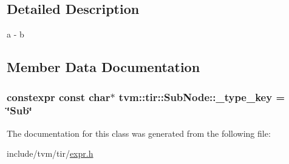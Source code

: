 \subsection{Detailed Description}
a -\/ b 

\subsection{Member Data Documentation}
\subsubsection[{\texorpdfstring{\+\_\+type\+\_\+key}{_type_key}}]{\setlength{\rightskip}{0pt plus 5cm}constexpr const char$\ast$ tvm\+::tir\+::\+Sub\+Node\+::\+\_\+type\+\_\+key = \char`\"{}Sub\char`\"{}\hspace{0.3cm}{\ttfamily [static]}}\hypertarget{classtvm_1_1tir_1_1SubNode_a0f09c013c78b25f5027cd52787d35264}{}\label{classtvm_1_1tir_1_1SubNode_a0f09c013c78b25f5027cd52787d35264}


The documentation for this class was generated from the following file\+:\begin{DoxyCompactItemize}
\item 
include/tvm/tir/\hyperlink{tir_2expr_8h}{expr.\+h}\end{DoxyCompactItemize}
